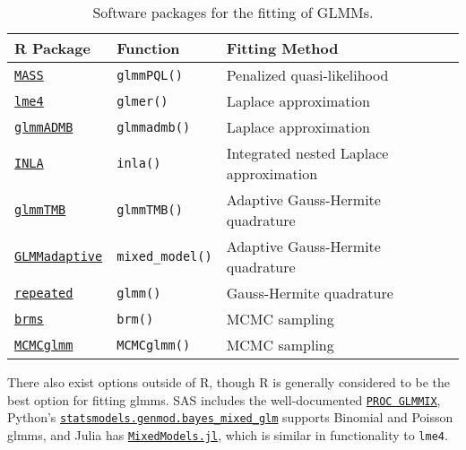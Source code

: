 \documentclass{report}
\begin{document}
\begin{table}[h!]
\centering
\begin{tabular}{||l l l||} 
 \hline
 \textbf{R Package} & \textbf{Function} & \textbf{Fitting Method} \\ [0.5ex] 
  \hline\hline
  \href{https://cran.r-project.org/web/packages/MASS/index.html}{\texttt{MASS}} & \texttt{glmmPQL()} & Penalized quasi-likelihood \\ 
  \hline
  \href{https://cran.r-project.org/web/packages/lme4/index.html}{\texttt{lme4}} & \texttt{glmer()} & Laplace approximation \\
  \hline
  \href{http://glmmadmb.r-forge.r-project.org}{\texttt{glmmADMB}} & \texttt{glmmadmb()} & Laplace approximation \\
  \hline
  \href{https://www.r-inla.org}{\texttt{INLA}} & \texttt{inla()} & Integrated nested Laplace approximation \\ 
  \hline
  \href{https://cran.r-project.org/web/packages/glmmTMB/index.html}{\texttt{glmmTMB}} & \texttt{glmmTMB()} & Adaptive Gauss-Hermite quadrature \\
  \hline
  \href{https://cran.r-project.org/web/packages/GLMMadaptive/index.html}{\texttt{GLMMadaptive}} & \texttt{mixed\_model()} & Adaptive Gauss-Hermite quadrature \\
  \hline
  \href{https://cran.r-project.org/web/packages/repeated/index.html}{\texttt{repeated}} & \texttt{glmm()} & Gauss-Hermite quadrature \\
  \hline 
  \href{https://cran.r-project.org/web/packages/brms/index.html}{\texttt{brms}} & \texttt{brm()} & MCMC sampling \\
  \hline
  \href{https://cran.r-project.org/web/packages/MCMCglmm/index.html}{\texttt{MCMCglmm}} & \texttt{MCMCglmm()} & MCMC sampling \\
  \hline
\end{tabular}
\caption{Software packages for the fitting of GLMMs.}
\label{table:glmm-software}
\end{table}

There also exist options outside of R, though R is generally considered to be the best option for fitting \glspl{glmm}. SAS includes the well-documented \href{https://support.sas.com/documentation/cdl/en/statug/63033/HTML/default/viewer.htm#glimmix_toc.htm}{\texttt{PROC GLMMIX}}, Python's \href{https://www.statsmodels.org/stable/mixed_glm.html}{\texttt{statsmodels.genmod.bayes\_mixed\_glm}} supports Binomial and Poisson \glspl{glmm}, and Julia has \href{https://juliastats.org/MixedModels.jl/stable/}{\texttt{MixedModels.jl}}, which is similar in functionality to \texttt{lme4}.  
\end{document}
